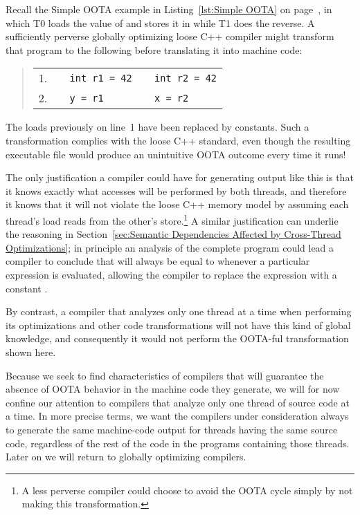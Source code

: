 Recall the Simple OOTA example in Listing~\ref{lst:Simple OOTA} on
page~\pageref{lst:Simple OOTA},
in which T0 loads the value of  and stores it in  while T1
does the reverse.
A sufficiently perverse globally optimizing loose C++ compiler might
transform that program to the following before translating it into
machine code:
\begin{quote}
\small
\begin{tabular}{r|l|l}
1. &
\texttt{~~int r1 = 42} &
	\texttt{~~int r2 = 42} \\
2. &
\texttt{~~y = r1} &
	\texttt{~~x = r2} \\
\end{tabular}
\end{quote}
The loads previously on line~1 have been replaced by constants.
Such a transformation complies with the loose C++ standard,
even though the resulting executable file would produce an unintuitive
OOTA outcome every time it runs!

The only justification a compiler could have for generating output like
this is that it knows exactly what accesses will be performed by both
threads, and therefore it knows that it will not violate the loose C++
memory model by assuming each thread's load reads from the other's
store.\footnote{
	A less perverse compiler could choose to avoid the
	OOTA cycle simply by not making this transformation.}
A similar justification can underlie the reasoning in
Section~\ref{sec:Semantic Dependencies Affected by Cross-Thread Optimizations};
in principle an analysis of the complete program could lead a compiler
to conclude that  will always be equal to  whenever a
particular  expression is evaluated, allowing the compiler
to replace the expression with a constant .

By contrast, a compiler that analyzes only one thread at a time when
performing its optimizations and other code transformations will not
have this kind of global knowledge, and consequently it would not
perform the OOTA-ful transformation shown here.

Because we seek to find characteristics of compilers that will
guarantee the absence of OOTA behavior in the machine code they generate,
we will for now confine our attention to compilers that analyze only
one thread of source code at a time.
In more precise terms, we want the compilers under consideration
always to generate the same machine-code output for threads having
the same source code, regardless of the rest of the code in the programs
containing those threads.
Later on we will return to globally optimizing compilers.

